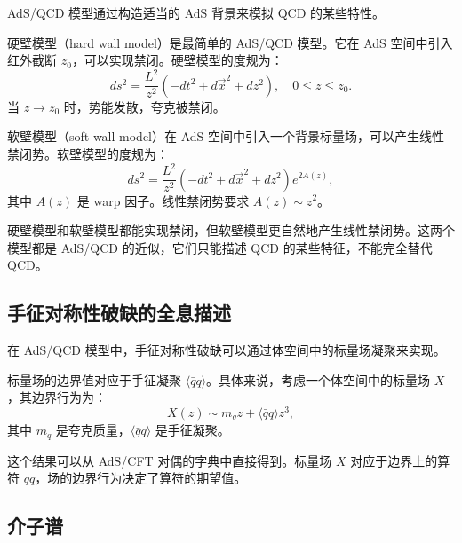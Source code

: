 AdS/QCD 模型通过构造适当的 AdS 背景来模拟 QCD 的某些特性。

\begin{definition}[硬壁模型]
硬壁模型（hard wall model）是最简单的 AdS/QCD 模型。它在 AdS 空间中引入红外截断 $z_0$，可以实现禁闭。硬壁模型的度规为：
\begin{equation}
    ds^2 = \frac{L^2}{z^2} \left( -dt^2 + d\vec{x}^2 + dz^2 \right), \quad 0 \leq z \leq z_0.
\end{equation}
当 $z \to z_0$ 时，势能发散，夸克被禁闭。
\end{definition}

\begin{definition}[软壁模型]
软壁模型（soft wall model）在 AdS 空间中引入一个背景标量场，可以产生线性禁闭势。软壁模型的度规为：
\begin{equation}
    ds^2 = \frac{L^2}{z^2} \left( -dt^2 + d\vec{x}^2 + dz^2 \right) e^{2A(z)},
\end{equation}
其中 $A(z)$ 是 warp 因子。线性禁闭势要求 $A(z) \sim z^2$。
\end{definition}

\begin{remark}
硬壁模型和软壁模型都能实现禁闭，但软壁模型更自然地产生线性禁闭势。这两个模型都是 AdS/QCD 的近似，它们只能描述 QCD 的某些特征，不能完全替代 QCD。
\end{remark}

\subsection{手征对称性破缺的全息描述}

在 AdS/QCD 模型中，手征对称性破缺可以通过体空间中的标量场凝聚来实现。

\begin{proposition}[手征对称性破缺的全息描述]
标量场的边界值对应于手征凝聚 $\langle \bar{q}q \rangle$。具体来说，考虑一个体空间中的标量场 $X$，其边界行为为：
\begin{equation}
    X(z) \sim m_q z + \langle \bar{q}q \rangle z^3,
\end{equation}
其中 $m_q$ 是夸克质量，$\langle \bar{q}q \rangle$ 是手征凝聚。
\end{proposition}

\begin{remark}
这个结果可以从 AdS/CFT 对偶的字典中直接得到。标量场 $X$ 对应于边界上的算符 $\bar{q}q$，场的边界行为决定了算符的期望值。
\end{remark}

\subsection{介子谱}


